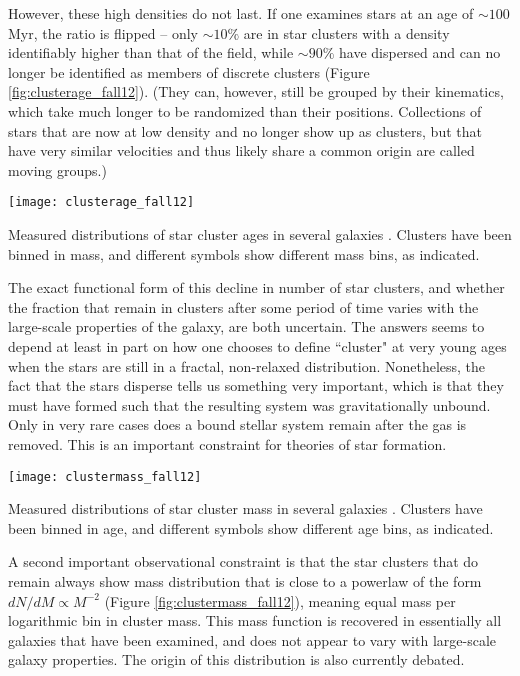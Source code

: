 However, these high densities do not last. If one examines stars at an age of $\sim 100$ Myr, the ratio is flipped -- only $\sim 10\%$ are in star clusters with a density identifiably higher than that of the field, while $\sim 90\%$ have dispersed and can no longer be identified as members of discrete clusters (Figure \ref{fig:clusterage_fall12}). (They can, however, still be grouped by their kinematics, which take much longer to be randomized than their positions. Collections of stars that are now at low density and no longer show up as clusters, but that have very similar velocities and thus likely share a common origin are called moving groups.)

\begin{marginfigure}
\texttt{[image: clusterage\_fall12]}
\caption[Star cluster age distributions]{
\label{fig:clusterage_fall12}
Measured distributions of star cluster ages in several galaxies \citep{fall12a}. Clusters have been binned in mass, and different symbols show different mass bins, as indicated.
}
\end{marginfigure}

The exact functional form of this decline in number of star clusters, and whether the fraction that remain in clusters after some period of time varies with the large-scale properties of the galaxy, are both uncertain. The answers seems to depend at least in part on how one chooses to define ``cluster" at very young ages when the stars are still in a fractal, non-relaxed distribution. Nonetheless, the fact that the stars disperse tells us something very important, which is that they must have formed such that the resulting system was gravitationally unbound. Only in very rare cases does a bound stellar system remain after the gas is removed. This is an important constraint for theories of star formation.

\begin{marginfigure}
\texttt{[image: clustermass\_fall12]}
\caption[Star cluster mass distributions]{
\label{fig:clustermass_fall12}
Measured distributions of star cluster mass in several galaxies \citep{fall12a}. Clusters have been binned in age, and different symbols show different age bins, as indicated.
}
\end{marginfigure}

A second important observational constraint is that the star clusters that do remain always show mass distribution that is close to a powerlaw of the form $dN/dM \propto M^{-2}$ (Figure \ref{fig:clustermass_fall12}), meaning equal mass per logarithmic bin in cluster mass. This mass function is recovered in essentially all galaxies that have been examined, and does not appear to vary with large-scale galaxy properties. The origin of this distribution is also currently debated.


